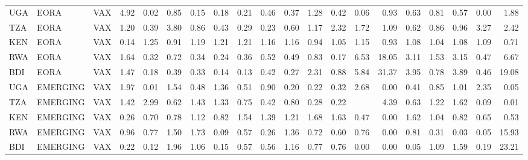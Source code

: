\documentclass[a4paper]{article}
\begin{document}
\begin{table}[ht]
{\begin{tabular}{lllrrrrrrrrrrrrrrrrr}
  UGA & EORA & VAX & 4.92 & 0.02 & 0.85 & 0.15 & 0.18 & 0.21 & 0.46 & 0.37 & 1.28 & 0.42 & 0.06 & 0.93 & 0.63 & 0.81 & 0.57 & 0.00 & 1.88 \\ 
  TZA & EORA & VAX & 1.20 & 0.39 & 3.80 & 0.86 & 0.43 & 0.29 & 0.23 & 0.60 & 1.17 & 2.32 & 1.72 & 1.09 & 0.62 & 0.86 & 0.96 & 3.27 & 2.42 \\ 
  KEN & EORA & VAX & 0.14 & 1.25 & 0.91 & 1.19 & 1.21 & 1.21 & 1.16 & 1.16 & 0.94 & 1.05 & 1.15 & 0.93 & 1.08 & 1.04 & 1.08 & 1.09 & 0.71 \\ 
  RWA & EORA & VAX & 1.64 & 0.32 & 0.72 & 0.34 & 0.24 & 0.36 & 0.52 & 0.49 & 0.83 & 0.17 & 6.53 & 18.05 & 3.11 & 1.53 & 3.15 & 0.47 & 6.67 \\ 
  BDI & EORA & VAX & 1.47 & 0.18 & 0.39 & 0.33 & 0.14 & 0.13 & 0.42 & 0.27 & 2.31 & 0.88 & 5.84 & 31.37 & 3.95 & 0.78 & 3.89 & 0.46 & 19.08 \\ \midrule
  UGA & EMERGING & VAX & 1.97 & 0.01 & 1.54 & 0.48 & 1.36 & 0.51 & 0.90 & 0.20 & 0.22 & 0.32 & 2.68 & 0.00 & 0.41 & 0.85 & 1.01 & 2.35 & 0.05 \\ 
  TZA & EMERGING & VAX & 1.42 & 2.99 & 0.62 & 1.43 & 1.33 & 0.75 & 0.42 & 0.80 & 0.28 & 0.22 &  & 4.39 & 0.63 & 1.22 & 1.62 & 0.09 & 0.01 \\ 
  KEN & EMERGING & VAX & 0.26 & 0.70 & 0.78 & 1.12 & 0.82 & 1.54 & 1.39 & 1.21 & 1.68 & 1.63 & 0.47 & 0.00 & 1.62 & 1.04 & 0.82 & 0.65 & 0.53 \\ 
  RWA & EMERGING & VAX & 0.96 & 0.77 & 1.50 & 1.73 & 0.09 & 0.57 & 0.26 & 1.36 & 0.72 & 0.60 & 0.76 & 0.00 & 0.81 & 0.31 & 0.03 & 0.05 & 15.93 \\ 
  BDI & EMERGING & VAX & 0.22 & 0.12 & 1.96 & 1.06 & 0.15 & 0.57 & 0.56 & 1.16 & 0.77 & 0.76 & 0.00 & 0.00 & 0.05 & 1.09 & 1.59 & 0.19 & 23.21 \\
   \bottomrule
\end{tabular}
}
\end{table}
\end{document}
